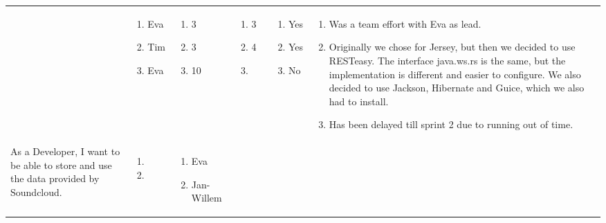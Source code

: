 \documentclass[11pt,a4paper,landscape]{article}
\begin{document}
\begin{table}[h]
\begin{tabular}{|p{5cm}|p{1.0cm}|p{2.5cm}|p{1.8cm}|p{1.8cm}|p{1.0cm}|p{12cm}}
& 
\begin{enumerate}[leftmargin=0.1cm,itemindent=0.1cm]
\item[] Eva 
\item[] Tim
\item[] Eva 
\end{enumerate}

& 
\begin{enumerate}[leftmargin=0.1cm,itemindent=0.1cm]
\item[] 3 
\item[] 3 
\item[] 10 
\end{enumerate}

&
\begin{enumerate}[leftmargin=0.1cm,itemindent=0.1cm]
\item[] 3 
\item[] 4 
\item[]
\end{enumerate}

&
\begin{enumerate}[leftmargin=0.1cm,itemindent=0.1cm]
\item[] Yes
\item[] Yes
\item[] No
\end{enumerate}

&
\begin{enumerate}[leftmargin=0.5cm,itemindent=0.1cm]
\item Was a team effort with Eva as lead.
\item Originally we chose for Jersey, but then we decided to use RESTeasy.
The interface java.ws.rs is the same, but the implementation is different and easier to configure.
We also decided to use Jackson, Hibernate and Guice, which we also had to install.
\item Has been delayed till sprint 2 due to running out of time.
\end{enumerate}
\\
As a Developer, I want to be able to store and use the data provided by Soundcloud. & \begin{enumerate}[leftmargin=0.3cm,itemindent=0.1cm]
\item 
\item
\end{enumerate}

& 
\begin{enumerate}[leftmargin=0.1cm,itemindent=0.1cm]
\item[] Eva 
\item[] Jan-Willem 
\end{enumerate}


\end{tabular}
\end{table}
\end{document}
